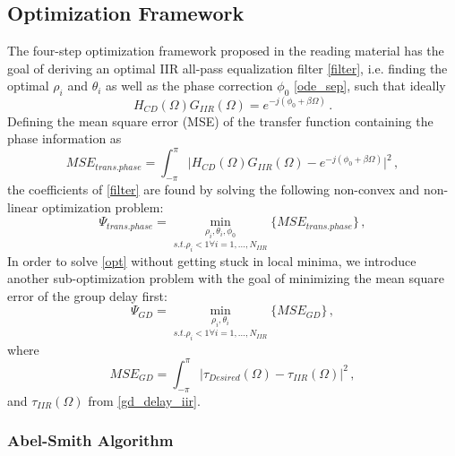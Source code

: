 \documentclass[paper=a4, fontsize=11pt]{scrartcl} %
\numberwithin{equation}{section} %
\numberwithin{figure}{section} %
\numberwithin{table}{section} %
\begin{document}
\subsection{Optimization Framework}

The four-step optimization framework proposed in the reading material has the goal of deriving an optimal IIR all-pass equalization filter \eqref{filter}, i.e. finding the optimal $\rho_i$ and $\theta_i$ as well as the phase correction $\phi_0$ \eqref{ode_sep}, such that ideally
\begin{equation} 
H_{CD}(\Omega)G_{IIR}(\Omega)=e^{-j(\phi_0+\beta\Omega)}\label{ideal_real}\, .
\end{equation}
Defining the mean square error (MSE) of the transfer function containing the phase information as
\begin{equation} 
MSE_{trans. phase}=\int_{-\pi}^{\pi}\Big|H_{CD}(\Omega)G_{IIR}(\Omega)-e^{-j(\phi_0+\beta\Omega)}\Big|^2\label{mse_tp}\, ,
\end{equation}
the coefficients of \eqref{filter} are found by solving the following non-convex and non-linear optimization problem:
\begin{equation} 
\Psi_{trans. phase}=\underset{s.t. \rho_i<1 \forall i=1,...,N_{IIR}}{\underset{\rho_i,\theta_i,\phi_0}{\operatorname{min}}}\Big\{MSE_{trans. phase}\Big\}\label{opt}\, ,
\end{equation}
In order to solve \eqref{opt} without getting stuck in local minima, we introduce another sub-optimization problem with the goal of minimizing the mean square error of the group delay first:
\begin{equation} 
\Psi_{GD}=\underset{s.t. \rho_i<1 \forall i=1,...,N_{IIR}}{\underset{\rho_i,\theta_i}{\operatorname{min}}}\Big\{MSE_{GD}\Big\}\label{opt_gd}\, ,
\end{equation}
where
\begin{equation} 
MSE_{GD}=\int_{-\pi}^{\pi}\Big|\tau_{Desired}(\Omega)-\tau_{IIR}(\Omega)\Big|^2\label{mse_gd}\, ,
\end{equation}
and $\tau_{IIR}(\Omega)$ from \eqref{gd_delay_iir}.

\subsubsection{Abel-Smith Algorithm}
\end{document}
